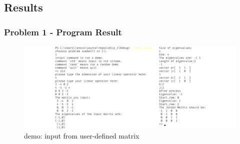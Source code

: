     \subsection{Results}
    \begin{frame}
        \frametitle{Problem 1 - Program Result}
        
        \begin{figure}
            \centering
            \includegraphics[height = 0.65\textheight]{img/result1.png}
            \caption{demo: input from user-defined matrix}
        \end{figure}
    \end{frame}